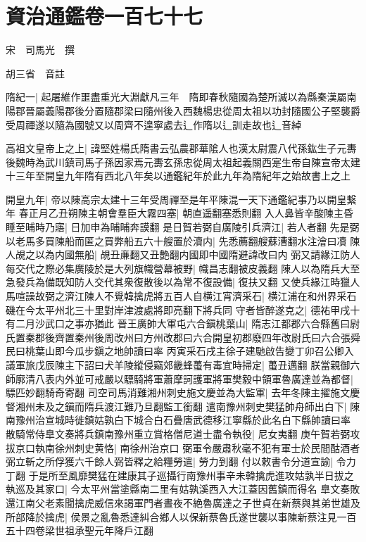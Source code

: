 \section{資治通鑑卷一百七十七}
宋　司馬光　撰

胡三省　音註

隋紀一|{
	起屠維作噩盡重光大淵獻凡三年　隋即春秋隨國為楚所滅以為縣秦漢屬南陽郡晉屬義陽郡後分置隨郡梁曰隨州後入西魏楊忠從周太祖以功封隨國公子堅襲爵受周禪遂以隨為國號又以周齊不遑寧處去辶作隋以辶訓走故也辶音綽}


高祖文皇帝上之上|{
	諱堅姓楊氏隋書云弘農郡華隂人也漢太尉震八代孫鈜生子元夀後魏時為武川鎮司馬子孫因家焉元夀玄孫忠從周太祖起義關西寔生帝自陳宣帝太建十三年至開皇九年隋有西北八年矣以通鑑紀年於此九年為隋紀年之始故書上之上}


開皇九年|{
	帝以陳高宗太建十三年受周禪至是年平陳混一天下通鑑紀事乃以開皇繋年}
春正月乙丑朔陳主朝會羣臣大霧四塞|{
	朝直遥翻塞悉則翻}
入人鼻皆辛酸陳主昏睡至晡時乃寤|{
	日加申為晡晡奔謨翻}
是日賀若弼自廣陵引兵濟江|{
	若人者翻}
先是弼以老馬多買陳船而匿之買弊船五六十艘置於瀆内|{
	先悉薦翻艘蘇漕翻水注澮曰凟}
陳人覘之以為内國無船|{
	覘丑亷翻又丑艶翻内國即中國隋避諱改曰内}
弼又請緣江防人每交代之際必集廣陵於是大列旗幟營幕被野|{
	幟昌志翻被皮義翻}
陳人以為隋兵大至急發兵為備既知防人交代其衆復散後以為常不復設備|{
	復扶又翻}
又使兵緣江時獵人馬喧譟故弼之濟江陳人不覺韓擒虎將五百人自横江宵濟采石|{
	横江浦在和州界采石磯在今太平州北三十里對岸津渡處將即亮翻下將兵同}
守者皆醉遂克之|{
	德祐甲戌十有二月沙武口之事亦猶此}
晉王廣帥大軍屯六合鎭桃葉山|{
	隋志江都郡六合縣舊曰尉氏置秦郡後齊置秦州後周改州曰方州改郡曰六合開皇初郡廢四年改尉氏曰六合張舜民曰桃葉山即今瓜步鎭之地帥讀曰率}
丙寅采石戌主徐子建馳啟告變丁卯召公卿入議軍旅戊辰陳主下詔曰犬羊陵縱侵竊郊畿蜂蠆有毒宜時掃定|{
	蠆丑邁翻}
朕當親御六師廓清八表内外並可戒嚴以驃騎將軍蕭摩訶護軍將軍樊毅中領軍魯廣達並為都督|{
	驃匹妙翻騎奇寄翻}
司空司馬消難湘州刺史施文慶並為大監軍|{
	去年冬陳主擢施文慶督湘州未及之鎭而隋兵渡江難乃旦翻監工銜翻}
遣南豫州刺史樊猛帥舟師出白下|{
	陳南豫州治宣城時徙鎮姑孰白下城合白石疊唐武德移江寧縣於此名白下縣帥讀曰率}
散騎常侍臯文奏將兵鎮南豫州重立賞格僧尼道士盡令執役|{
	尼女夷翻}
庚午賀若弼攻拔京口執南徐州刺史黄恪|{
	南徐州治京口}
弼軍令嚴肅秋毫不犯有軍士於民間酤酒者弼立斬之所俘獲六千餘人弼皆釋之給糧勞遣|{
	勞力到翻}
付以敕書令分道宣諭|{
	令力丁翻}
于是所至風靡樊猛在建康其子巡攝行南豫州事辛未韓擒虎進攻姑孰半日拔之執巡及其家口|{
	今太平州當塗縣南二里有姑孰溪西入大江蓋因舊鎮而得名}
臯文奏敗還江南父老素聞擒虎威信來謁軍門者晝夜不絶魯廣達之子世貞在新蔡與其弟世雄及所部降於擒虎|{
	侯景之亂魯悉達糾合鄉人以保新蔡魯氏遂世襲以事陳新蔡注見一百五十四卷梁世祖承聖元年降戶江翻}
